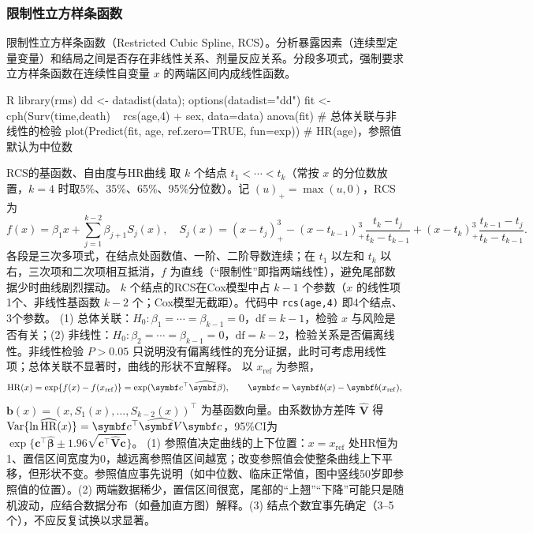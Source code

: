 \subsubsection{限制性立方样条函数}
限制性立方样条函数（Restricted Cubic Spline, RCS）。分析暴露因素（连续型定量变量）和结局之间是否存在非线性关系、剂量反应关系。分段多项式，强制要求立方样条函数在连续性自变量 $x$ 的两端区间内成线性函数。
\par\noindent
\begin{coursecode}{R}
library(rms)
dd <- datadist(data); options(datadist="dd")
fit <- cph(Surv(time,death) ~ rcs(age,4) + sex, data=data)
anova(fit)                         # 总体关联与非线性的检验
plot(Predict(fit, age, ref.zero=TRUE, fun=exp))   # HR(age)，参照值默认为中位数
\end{coursecode}
\par
\begin{derivation}{RCS的基函数、自由度与HR曲线}
取 $k$ 个结点 $t_1<\cdots<t_k$（常按 $x$ 的分位数放置，$k=4$ 时取5\%、35\%、65\%、95\%分位数）。记 $(u)_+=\max(u,0)$，RCS为
\[
f(x)=\beta_1x+\sum_{j=1}^{k-2}\beta_{j+1}S_j(x),\quad
S_j(x)=(x-t_j)_+^3-(x-t_{k-1})_+^3\frac{t_k-t_j}{t_k-t_{k-1}}+(x-t_k)_+^3\frac{t_{k-1}-t_j}{t_k-t_{k-1}}.
\]
各段是三次多项式，在结点处函数值、一阶、二阶导数连续；在 $t_1$ 以左和 $t_k$ 以右，三次项和二次项相互抵消，$f$ 为直线（“限制性”即指两端线性），避免尾部数据少时曲线剧烈摆动。
$k$ 个结点的RCS在Cox模型中占 $k-1$ 个参数（$x$ 的线性项1个、非线性基函数 $k-2$ 个；Cox模型无截距）。代码中 \texttt{rcs(age,4)} 即4个结点、3个参数。
(1) 总体关联：$H_0:\beta_1=\cdots=\beta_{k-1}=0$，$\mathrm{df}=k-1$，检验 $x$ 与风险是否有关；(2) 非线性：$H_0:\beta_2=\cdots=\beta_{k-1}=0$，$\mathrm{df}=k-2$，检验关系是否偏离线性。非线性检验 $P>0.05$ 只说明没有偏离线性的充分证据，此时可考虑用线性项；总体关联不显著时，曲线的形状不宜解释。
以 $x_{\mathrm{ref}}$ 为参照，
\[
\HR(x)=\exp\{f(x)-f(x_{\mathrm{ref}})\}=\exp(\bm c^\top\widehat{\bm\beta}),\qquad \bm c=\bm b(x)-\bm b(x_{\mathrm{ref}}),
\]
$\bm b(x)=(x,S_1(x),\ldots,S_{k-2}(x))^\top$ 为基函数向量。由系数协方差阵 $\widehat{\bm V}$ 得 $\Var\{\ln\widehat{\HR}(x)\}=\bm c^\top\widehat{\bm V}\bm c$，95\%CI为 $\exp\{\bm c^\top\widehat{\bm\beta}\pm1.96\sqrt{\bm c^\top\widehat{\bm V}\bm c}\}$。
(1) 参照值决定曲线的上下位置：$x=x_{\mathrm{ref}}$ 处HR恒为1、置信区间宽度为0，越远离参照值区间越宽；改变参照值会使整条曲线上下平移，但形状不变。参照值应事先说明（如中位数、临床正常值，图中竖线50岁即参照值的位置）。(2) 两端数据稀少，置信区间很宽，尾部的“上翘”“下降”可能只是随机波动，应结合数据分布（如叠加直方图）解释。(3) 结点个数宜事先确定（3--5个），不应反复试换以求显著。
\end{derivation}
